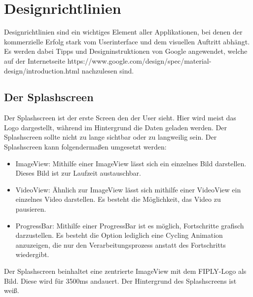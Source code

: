 \documentclass[FIPLY_base.tex]{subfiles}
\begin{document}
	
\section{Designrichtlinien}
Designrichtlinien sind ein wichtiges Element aller Applikationen, bei denen der kommerzielle Erfolg stark vom Userinterface und dem visuellen Auftritt abhängt. Es werden dabei Tipps und Designinstruktionen von Google angewendet, welche auf der Internetseite https://www.google.com/design/spec/material-design/introduction.html nachzulesen sind. 

\subsection{Der Splashscreen}
Der Splashscreen ist der erste Screen den der User sieht. Hier wird meist das Logo dargestellt, während im Hintergrund die Daten geladen werden.
Der Splashscreen sollte nicht zu lange sichtbar oder zu langweilig sein. Der Splashscreen kann folgendermaßen umgesetzt werden:
\begin{itemize}
	\item ImageView: Mithilfe einer ImageView lässt sich ein einzelnes Bild darstellen. Dieses Bild ist zur Laufzeit austauschbar.
	\item VideoView: Ähnlich zur ImageView lässt sich mithilfe einer VideoView ein einzelnes Video darstellen. Es besteht die Möglichkeit, das Video zu pausieren.
	\item ProgressBar: Mithilfe einer ProgressBar ist es möglich, Fortschritte grafisch darzustellen. Es besteht die Option lediglich eine Cycling Animation anzuzeigen, die nur den Verarbeitungsprozess anstatt des Fortschritts wiedergibt.
\end{itemize}
Der Splashscreen beinhaltet eine zentrierte ImageView mit dem FIPLY-Logo als Bild. Diese wird für 3500ms andauert. Der Hintergrund des Splashscreens ist weiß. 
\end{document}
